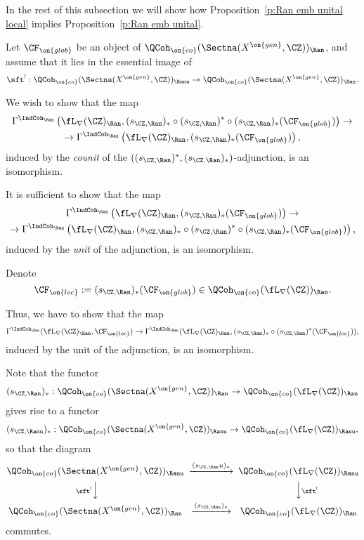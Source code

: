 \documentclass[9pt]{amsart}
\theoremstyle{remark}
\theoremstyle{definition}
\theoremstyle{remark}
\newcommand{\propref}[1]{Proposition~\ref{#1}}
\numberwithin{equation}{section}
\begin{document}
In the rest of this subsection we will show how \propref{p:Ran emb unital local} implies 
\propref{p:Ran emb unital}. 

\sssec{}

Let $\CF_{\on{glob}}$ be an object of $\QCoh_{\on{co}}(\Sectna(X^{\on{gen}},\CZ))_\Ran$, and assume that 
it lies in the essential image of
$$\sft^!:\QCoh_{\on{co}}(\Sectna(X^{\on{gen}},\CZ))_\Ranu \to \QCoh_{\on{co}}(\Sectna(X^{\on{gen}},\CZ))_\Ran.$$

We wish to show that the map
\begin{multline*}
\Gamma^{\IndCoh_\Ran}\left(\fL_\nabla(\CZ)_\Ran, (s_{\CZ,\Ran})_*\circ (s_{\CZ,\Ran})^*\circ (s_{\CZ,\Ran})_*(\CF_{\on{glob}})\right) \to \\
\to \Gamma^{\IndCoh_\Ran}\left(\fL_\nabla(\CZ)_\Ran,(s_{\CZ,\Ran})_*(\CF_{\on{glob}})\right),
\end{multline*}
induced by the \emph{counit} of the $((s_{\CZ,\Ran})^*,(s_{\CZ,\Ran})_*)$-adjunction, is an isomorphism.

\medskip

It is sufficient to show that the map
\begin{multline*}
\Gamma^{\IndCoh_\Ran}\left(\fL_\nabla(\CZ)_\Ran, (s_{\CZ,\Ran})_*(\CF_{\on{glob}})\right)\to \\
\to \Gamma^{\IndCoh_\Ran}\left(\fL_\nabla(\CZ)_\Ran,(s_{\CZ,\Ran})_*\circ (s_{\CZ,\Ran})^*\circ (s_{\CZ,\Ran})_*(\CF_{\on{glob}})\right),
\end{multline*}
induced by the \emph{unit} of the adjunction, is an isomorphism.

\sssec{}

Denote 
$$\CF_{\on{loc}}:=(s_{\CZ,\Ran})_*(\CF_{\on{glob}})\in \QCoh_{\on{co}}(\fL_\nabla(\CZ))_\Ran.$$

\medskip

Thus, we have to show that the map
\begin{equation} \label{e:F loc}
\Gamma^{\IndCoh_\Ran}(\fL_\nabla(\CZ)_\Ran,\CF_{\on{loc}})
\to \Gamma^{\IndCoh_\Ran}(\fL_\nabla(\CZ)_\Ran,(s_{\CZ,\Ran})_*\circ (s_{\CZ,\Ran})^*(\CF_{\on{loc}})),
\end{equation}  
induced by the unit of the adjunction, is an isomorphism.

\sssec{}

Note that the functor 
$$(s_{\CZ,\Ran})_*:\QCoh_{\on{co}}(\Sectna(X^{\on{gen}},\CZ))_\Ran\to \QCoh_{\on{co}}(\fL_\nabla(\CZ))_\Ran$$
gives rise to a functor
$$(s_{\CZ,\Ranu})_*:\QCoh_{\on{co}}(\Sectna(X^{\on{gen}},\CZ))_\Ranu\to \QCoh_{\on{co}}(\fL_\nabla(\CZ))_\Ranu,$$
so that the diagram
$$
\CD
\QCoh_{\on{co}}(\Sectna(X^{\on{gen}},\CZ))_\Ranu @>{(s_{\CZ,\Ran}u)_*}>> \QCoh_{\on{co}}(\fL_\nabla(\CZ))_\Ranu \\
@V{\sft^!}VV @VV{\sft^!}V \\
\QCoh_{\on{co}}(\Sectna(X^{\on{gen}},\CZ))_\Ran @>{(s_{\CZ,\Ran})_*}>> \QCoh_{\on{co}}(\fL_\nabla(\CZ))_\Ran
\endCD
$$
commutes. 
\end{document}
